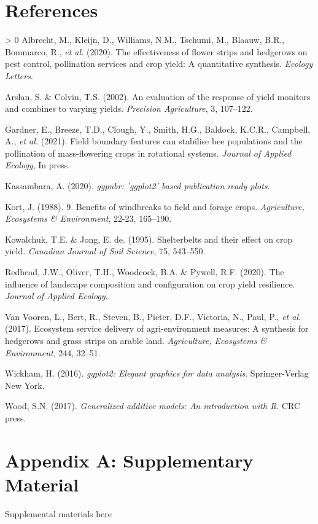 \documentclass[]{elsarticle} %
\newlength{\cslhangindent}
\newenvironment{CSLReferences}[3] %
 {%
  \setlength{\parindent}{0pt}
  \ifodd #1 \everypar{\setlength{\hangindent}{\cslhangindent}}\ignorespaces\fi
  \ifnum #2 > 0
  \setlength{\parskip}{#2\baselineskip}
  \fi
 }%
 {}
\begin{document}
\hypertarget{references}{%
\section*{References}\label{references}}

\hypertarget{refs}{}
\begin{CSLReferences}{1}{0}
\leavevmode\hypertarget{ref-albrecht2020}{}%
Albrecht, M., Kleijn, D., Williams, N.M., Tschumi, M., Blaauw, B.R., Bommarco, R., \emph{et al.} (2020). The effectiveness of flower strips and hedgerows on pest control, pollination services and crop yield: A quantitative synthesis. \emph{Ecology Letters}.

\leavevmode\hypertarget{ref-arslan2002}{}%
Arslan, S. \& Colvin, T.S. (2002). An evaluation of the response of yield monitors and combines to varying yields. \emph{Precision Agriculture}, 3, 107--122.

\leavevmode\hypertarget{ref-gardner2021}{}%
Gardner, E., Breeze, T.D., Clough, Y., Smith, H.G., Baldock, K.C.R., Campbell, A., \emph{et al.} (2021). Field boundary features can stabilise bee populations and the pollination of mass-flowering crops in rotational systems. \emph{Journal of Applied Ecology}, In press.

\leavevmode\hypertarget{ref-kassambara2020}{}%
Kassambara, A. (2020). \emph{{ggpubr}: 'ggplot2' based publication ready plots}.

\leavevmode\hypertarget{ref-kort1988}{}%
Kort, J. (1988). 9. Benefits of windbreaks to field and forage crops. \emph{Agriculture, Ecosystems {\&} Environment}, 22-23, 165--190.

\leavevmode\hypertarget{ref-kowalchuk1995}{}%
Kowalchuk, T.E. \& Jong, E. de. (1995). Shelterbelts and their effect on crop yield. \emph{Canadian Journal of Soil Science}, 75, 543--550.

\leavevmode\hypertarget{ref-redhead2020}{}%
Redhead, J.W., Oliver, T.H., Woodcock, B.A. \& Pywell, R.F. (2020). The influence of landscape composition and configuration on crop yield resilience. \emph{Journal of Applied Ecology}.

\leavevmode\hypertarget{ref-vanVooren2017}{}%
Van Vooren, L., Bert, R., Steven, B., Pieter, D.F., Victoria, N., Paul, P., \emph{et al.} (2017). Ecosystem service delivery of agri-environment measures: A synthesis for hedgerows and grass strips on arable land. \emph{Agriculture, Ecosystems {\&} Environment}, 244, 32--51.

\leavevmode\hypertarget{ref-wickham2016}{}%
Wickham, H. (2016). \emph{{ggplot2}: Elegant graphics for data analysis}. Springer-Verlag New York.

\leavevmode\hypertarget{ref-wood2017}{}%
Wood, S.N. (2017). \emph{Generalized additive models: An introduction with {R}}. CRC press.

\end{CSLReferences}

\newpage

\hypertarget{appendix-a-supplementary-material}{%
\section*{Appendix A: Supplementary Material}\label{appendix-a-supplementary-material}}

Supplemental materials here
\end{document}
